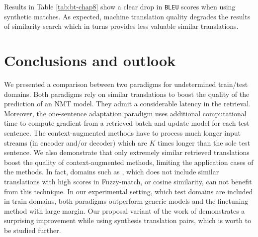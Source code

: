 Results in Table \ref{tab:bt-chap8} show a clear drop in \texttt{BLEU} scores when using synthetic matches.
As expected, machine translation quality degrades the results of similarity search which in turns provides less valuable similar translations.

\begin{table}[h!]
\begin{center}
\end{center}
  \caption{Results for a reduced test set (279 sentences) using  when integrating human and synthetic (back-translated) translations. Here, $par = parallel$, $mon = monolingual$}
  \label{tab:bt-chap8}
\end{table}

\section{Conclusions and outlook}
\label{sec:conclusions-chap8}
We presented a comparison between two paradigms for undetermined train/test domains. Both paradigms rely on similar translations to boost the quality of the prediction of an NMT model. They admit a considerable latency in the retrieval. Moreover, the one-sentence adaptation paradigm uses additional computational time to compute gradient from a retrieved batch and update model for each test sentence. The context-augmented methods have to process much longer input streams (in encoder and/or decoder) which are $K$ times longer than the sole test sentence. We also demonstrate that only extremely similar retrieved translations boost the quality of context-augmented methods, limiting the application cases of the methods. In fact, domains such as , which does not include similar translations with high scores in Fuzzy-match, or cosine similarity, can not benefit from this technique. In our experimental setting, which test domains are included in train domains, both paradigms outperform generic models and the finetuning method with large margin. Our proposal variant of the work of \citet{bulte19neural} demonstrates a surprising improvement while using synthesis translation pairs, which is worth to be studied further.

